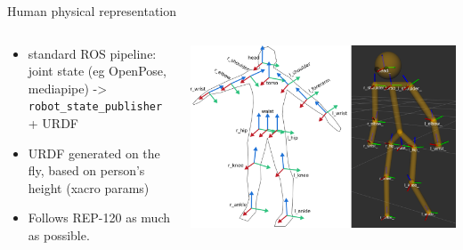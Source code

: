 \documentclass[xcolor=table,aspectratio=169]{beamer}
\begin{document}
\begin{frame}{Human physical representation}

    \begin{columns}
        \begin{column}{0.4\linewidth}
            \begin{itemize}
                \item standard ROS pipeline: joint state (eg OpenPose, mediapipe) -> \texttt{robot\_state\_publisher} + URDF

                \item URDF generated on the fly, based on person’s height (xacro params)

                \item Follows REP-120 as much as possible.
            \end{itemize}
        \end{column}
        \begin{column}{0.6\linewidth}
            \begin{center}
                \includegraphics[width=\linewidth]{ros4hri/skeletons}
            \end{center}
        \end{column}
    \end{columns}
\end{frame}
\end{document}
